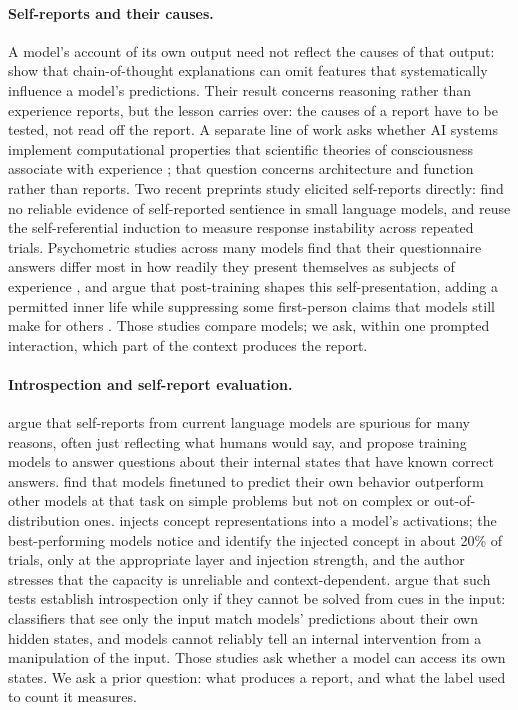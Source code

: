 \documentclass[11pt]{article}
\begin{document}
\paragraph{Self-reports and their causes.}
A model's account of its own output need not reflect the causes of that
output: \citet{turpin2023unfaithful} show that chain-of-thought explanations
can omit features that systematically influence a model's predictions.
Their result concerns reasoning rather than experience reports, but the
lesson carries over: the causes of a report have to be tested, not read off
the report. A separate line of work asks
whether AI systems implement computational properties that scientific
theories of consciousness associate with experience
\citep{butlin2023consciousness}; that question concerns architecture and
function rather than reports. Two recent preprints study elicited
self-reports directly: \citet{kaiser2026sentience} find no reliable evidence of
self-reported sentience in small language models, and \citet{balani2026instability}
reuse the self-referential induction to measure response instability across
repeated trials. Psychometric studies across many models find that their
questionnaire answers differ most in how readily they present themselves as
subjects of experience \citep{plisiecki2026pinocchio}, and argue that
post-training shapes this self-presentation, adding a permitted inner life
while suppressing some first-person claims that models still make for others
\citep{plisiecki2026twoprocess}. Those studies compare models; we ask, within
one prompted interaction, which part of the context produces the report.

\paragraph{Introspection and self-report evaluation.}
\citet{perez2023selfreports} argue that self-reports from current language
models are spurious for many reasons, often just reflecting what humans
would say, and propose training models to answer questions about their
internal states that have known correct answers. \citet{binder2024looking}
find that models finetuned to predict their own behavior outperform other
models at that task on simple problems but not on complex or
out-of-distribution ones. \citet{lindsey2025introspective} injects concept
representations into a model's activations; the best-performing models
notice and identify the injected concept in about 20\% of trials, only at the
appropriate layer and injection strength, and the author stresses that the
capacity is unreliable and context-dependent. \citet{singh2026introspect}
argue that such tests establish introspection only if they cannot be solved
from cues in the input: classifiers that see only the input match models'
predictions about their own hidden states, and models cannot reliably tell
an internal intervention from a manipulation of the input. Those studies ask
whether a model can access its own states. We ask a prior question: what produces a report, and what the label
used to count it measures.
\end{document}

